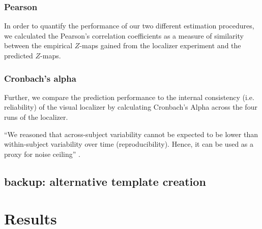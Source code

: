 \subsubsection{Pearson}
%
In order to quantify the performance of our two different estimation procedures,
we calculated the Pearson's correlation coefficients as a measure of similarity
between the empirical $Z$-maps gained from the localizer experiment and the
predicted $Z$-maps.


\subsubsection{Cronbach's alpha}

Further, we compare the prediction performance to the internal consistency (i.e.
reliability) of the visual localizer by calculating Cronbach's Alpha across the
four runs of the localizer.


``We reasoned that across-subject variability cannot be expected to be lower
than within-subject variability over time (reproducibility).
%
Hence, it can be used as a proxy for noise ceiling''
\citep{rosenke2021probabilistic}.


\subsection{backup: alternative template creation}









\section{Results}

